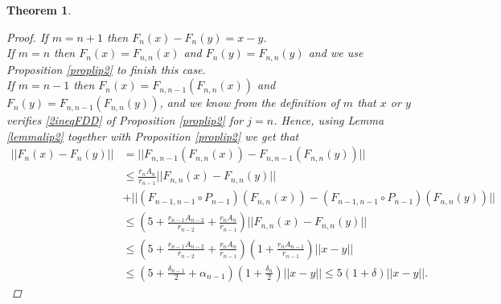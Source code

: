 \documentclass[11pt]{amsart}
\newcommand{\<}{\langle}
\renewcommand{\>}{\rangle}
\newtheorem{theorem}{Theorem}[section]
\theoremstyle{definition}
\theoremstyle{remark}
\numberwithin{equation}{section}
\begin{document}
\begin{theorem}
\begin{proof}
If $m=n+1$ then $F_n(x)-F_n(y)=x-y$.\\

If  $m=n$ then $F_{n}(x)=F_{n,n}(x)$ and $F_n(y)=F_{n,n}(y)$ and we use Proposition \ref{proplip2} to finish this case.\\

If $m=n-1$ then $F_n(x)=F_{n,n-1}(F_{n,n}(x))$ and $F_n(y)=F_{n,n-1}(F_{n,n}(y))$, and we know from the definition of $m$ that $x$ or $y$ verifies \eqref{2ineqFDD} of Proposition \ref{proplip2} for $j=n$. Hence, using Lemma \ref{lemmalip2} together with Proposition \ref{proplip2} we get that
$$\begin{aligned} ||F_n(x)-F_n(y)||&=||F_{n,n-1}(F_{n,n}(x))-F_{n,n-1}(F_{n,n}(y))||\\
&\le \frac{r_nA_n}{r_{n-1}}||F_{n,n}(x)-F_{n,n}(y)||\\
&+\big|\big|(F_{n-1,n-1}\circ P_{n-1})(F_{n,n}(x))-(F_{n-1,n-1}\circ P_{n-1})(F_{n,n}(y))\big|\big|\\
&\le\left(5+\frac{r_{n-1}A_{n-2}}{r_{n-2}}+\frac{r_nA_n}{r_{n-1}}\right)||F_{n,n}(x)-F_{n,n}(y)||\\
&\le\left(5+\frac{r_{n-1}A_{n-2}}{r_{n-2}}+\frac{r_nA_n}{r_{n-1}}\right)\left( 1+\frac{r_nA_{n-1}}{r_{n-1}} \right)||x-y||\\
&\le\left( 5+\frac{\delta_{n-1}}{2}+\alpha_{n-1} \right)\left( 1+\frac{\delta_n}{2} \right)||x-y||\le5(1+\delta)||x-y||.
\end{aligned}$$


\end{proof}
\end{theorem}
\end{document}

